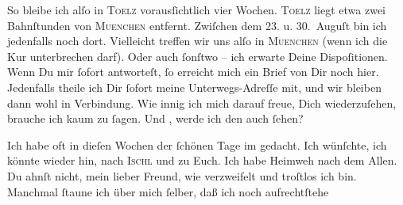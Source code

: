 \pstart
           So bleibe ich alſo in \textsc{Toelz} vorausſichtlich vier Wochen. \textsc{Toelz} liegt etwa zwei Bahnſtunden von \textsc{Muenchen} entfernt. Zwiſchen dem 23. u. 30. Auguſt bin ich jedenfalls noch dort. Vielleicht
               treffen wir uns alſo in \textsc{Muenchen} (wenn ich die Kur unterbrechen darf). Oder auch ſonſtwo – ich erwarte Deine
               Dispoſitionen. Wenn Du mir ſofort antworteſt, ſo erreicht mich ein Brief von Dir noch
               hier. Jedenfalls theile ich Dir {\pb}ſofort meine  Unterwegs-Adreſſe mit, und wir bleiben dann wohl in Verbindung. Wie innig ich
               mich darauf freue, Dich wiederzuſehen, brauche ich kaum zu ſagen. Und \label{K_L02741-2v}\label{K_L02741-2}, werde ich den auch ſehen?\pend
           
\pstart
           Ich habe oft in dieſen Wochen der ſchönen Tage im \label{K_L02741-3v}\label{K_L02741-3} gedacht. Ich wünſchte, ich könnte wieder hin, nach \textsc{Ischl}{ } und zu Euch. Ich habe Heimweh nach dem Allen. Du
               ahnſt nicht, mein lieber Freund, wie verzweifelt und troſtlos ich bin. Manchmal
               ſtaune ich über mich ſelber, daß ich {\pb}noch
                  aufrechtſtehe{\dotssix}\pend
           
